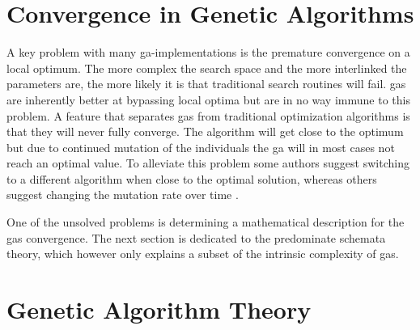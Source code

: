 \section{Convergence in Genetic Algorithms}
A key problem with many \gls{ga}-implementations is the premature convergence on a local optimum. The more complex the search space and the more interlinked the parameters are, the more likely it is that traditional search routines will fail. \glspl{ga} are inherently better at bypassing local optima but are in no way immune to this problem. A feature that separates \glspl{ga} from traditional optimization algorithms is that they will never fully converge. The algorithm will get close to the optimum but due to continued mutation of the individuals the \gls{ga} will in most cases not reach an optimal value. To alleviate this problem some authors suggest switching to a different algorithm when close to the optimal solution, whereas others suggest changing the mutation rate over time \citep[see][and references therein]{citeulike:344183}.

One of the unsolved problems is determining a mathematical description for the \glspl{ga} convergence. The next section is dedicated to the predominate schemata theory, which however only explains a subset of the intrinsic complexity of \glspl{ga}.

\section{Genetic Algorithm Theory}

